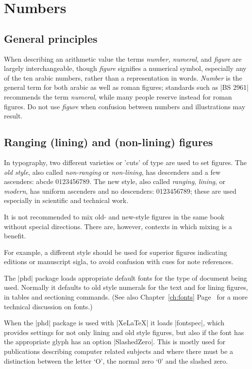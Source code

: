 \chapter{Numbers}
\label{ch:numbers}
\newfontfamily{}
\section{General principles}

When describing an arithmetic value the terms \textit{number, numeral}, and \textit{figure} are largely interchangeable, though \textit{figure} signifies a numerical symbol, especially any of the ten arabic numbers, rather than a representation in words. \textit{Number} is the general term for both arabic as well as roman figures; standards such as |BS 2961| recommends the term \textit{numeral}, while many people reserve instead for roman figures. Do not use \textit{figure} when confusion between numbers and illustrations may result.

\section{Ranging (lining) and (non-lining) figures }

In typography, two different varieties or 'cuts' of type are used to set
figures. The \emph{old style}, also called \emph{non-ranging} or \emph{non-lining}, has descenders
and a few ascenders: \bgroup\bonum 
abcde 0123456789\egroup. The new style, also called \emph{ranging},
\emph{lining}, or \emph{modern}, has uniform ascenders and no descenders: 0123456789; these are used especially in scientific and technical work.

It is not recommended to mix old- and new-style figures in the same book without special
directions. There are, however, contexts in which mixing is a benefit.

For example, a different style should be used for superior figures indicating
editions or manuscript sigla, to avoid confusion with cues for
note references.

The |phd| package loads appropriate default fonts for the type of document being used. Normally it defaults to old style numerals for the text and for lining figures, in tables and sectioning commands. (See also Chapter~\ref{ch:fonts}  Page~\pageref{ch:fonts} for a more technical discussion on fonts.) 

When the |phd| package is used with |XeLaTeX| it loads |fontspec|, which provides settings for not only lining and old style figures, but also if the font has the appropriate glyph has an option |SlashedZero|. This is mostly used for publications describing computer related subjects and where there must be a distinction between the letter `O', the normal zero `0' and the slashed zero. 

